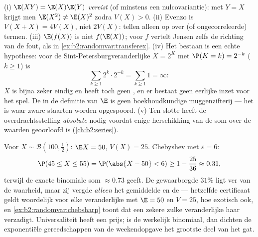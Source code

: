 \begin{remark}
(i) $\E(XY) = \E(X)\E(Y)$ \emph{vereist}  (of
minstens een nulcovariantie): met $Y = X$ krijgt men $\E(X^2) \neq
\E(X)^2$ zodra $V(X) > 0$. (ii) Evenzo is $V(X + X) = 4V(X)$, niet
$2V(X)$:  tellen alleen op over  (of
ongecorreleerde) termen. (iii) $\E(f(X))$ is niet $f(\E(X))$; voor
 $f$ vertelt Jensen zelfs de richting van de fout, als in
\cref{ex:b2:randomvar:transferex}. (iv) Het bestaan is een echte
hypothese: voor de Sint-Petersburgveranderlijke $X = 2^K$ met $\P(K
= k) = 2^{-k}$ ($k \geq 1$) is
\[
\sum_{k\geq1}2^k\cdot2^{-k} = \sum_{k\geq1}1 = \infty :
\]
$X$ is bijna zeker eindig en heeft toch geen , en
er bestaat geen eerlijke inzet voor het spel. De  in
de definitie van $\E$ is geen boekhoudkundige muggenzifterij ---
het is waar zware staarten worden opgespoord. (v) Ten slotte heeft
de overdrachtsstelling \emph{absolute}  nodig
voordat enige herschikking van de som over de waarden geoorloofd is
(\cref{ch:b2:series}).
\end{remark}


\begin{example}\label{ex:b2:randomvar:hundredtosses}
Voor $X \sim \mathcal B(100, \frac12)$: $\E X = 50$, $V(X) = 25$.
Chebyshev met $\varepsilon = 6$:
\[
\P(45 \leq X \leq 55) = \P(\abs{X - 50} < 6)
\geq 1 - \frac{25}{36} \approx 0.31 ,
\]
terwijl de exacte binomiale som $\approx 0.73$ geeft. De
gewaarborgde $31\%$ ligt ver van de waarheid, maar zij vergde
\emph{alleen} het gemiddelde en de  --- hetzelfde
certificaat geldt woordelijk voor elke veranderlijke met $\E = 50$
en $V = 25$, hoe exotisch ook, en
\cref{ex:b2:randomvar:chebsharp} toont dat een zekere zulke
veranderlijke haar verzadigt. Universaliteit heeft een prijs; is de
 werkelijk binomiaal, dan dichten de exponentiële
gereedschappen van de weekendopgave het grootste deel van het gat.
\end{example}

